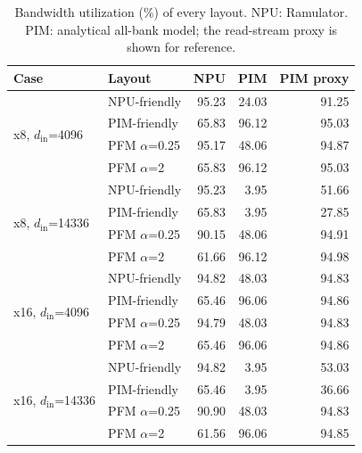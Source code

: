\begin{table}[t]
\centering
\caption{Bandwidth utilization (\%) of every layout. NPU: Ramulator. PIM: analytical all-bank model; the read-stream proxy is shown for reference.}
\label{tab:results}
\setlength{\tabcolsep}{4pt}
\begin{tabular}{llrrr}
\toprule
Case & Layout & NPU & PIM & PIM proxy \\
\midrule
\multirow{4}{*}{x8, $d_{\mathrm{in}}$=4096} & NPU-friendly & 95.23 & 24.03 & 91.25 \\
 & PIM-friendly & 65.83 & 96.12 & 95.03 \\
 & PFM $\alpha$=0.25 & 95.17 & 48.06 & 94.87 \\
 & PFM $\alpha$=2 & 65.83 & 96.12 & 95.03 \\
\midrule
\multirow{4}{*}{x8, $d_{\mathrm{in}}$=14336} & NPU-friendly & 95.23 & 3.95 & 51.66 \\
 & PIM-friendly & 65.83 & 3.95 & 27.85 \\
 & PFM $\alpha$=0.25 & 90.15 & 48.06 & 94.91 \\
 & PFM $\alpha$=2 & 61.66 & 96.12 & 94.98 \\
\midrule
\multirow{4}{*}{x16, $d_{\mathrm{in}}$=4096} & NPU-friendly & 94.82 & 48.03 & 94.83 \\
 & PIM-friendly & 65.46 & 96.06 & 94.86 \\
 & PFM $\alpha$=0.25 & 94.79 & 48.03 & 94.83 \\
 & PFM $\alpha$=2 & 65.46 & 96.06 & 94.86 \\
\midrule
\multirow{4}{*}{x16, $d_{\mathrm{in}}$=14336} & NPU-friendly & 94.82 & 3.95 & 53.03 \\
 & PIM-friendly & 65.46 & 3.95 & 36.66 \\
 & PFM $\alpha$=0.25 & 90.90 & 48.03 & 94.83 \\
 & PFM $\alpha$=2 & 61.56 & 96.06 & 94.85 \\
\bottomrule
\end{tabular}
\end{table}
